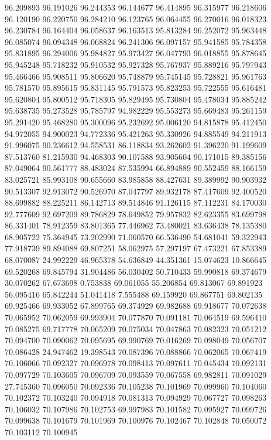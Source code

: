 96.209893
96.191026
96.244353
96.144677
96.414895
96.315977
96.218606
96.120190
96.220750
96.284210
96.123765
96.064455
96.270016
96.018323
96.230784
96.164404
96.058637
96.163513
95.813284
96.252072
95.963448
96.085074
96.094348
96.068824
96.241306
96.097157
95.941585
95.784358
95.831895
96.294006
95.984827
95.973427
96.047793
96.018855
95.878645
95.945248
95.718232
95.910532
95.927328
95.767937
95.889216
95.797943
95.466466
95.908511
95.806620
95.748879
95.745145
95.728821
95.961763
95.781570
95.895615
95.831145
95.791573
95.823253
95.722555
95.616481
95.620804
95.800512
95.718305
95.829495
95.730804
95.478034
95.885242
95.638735
95.273528
95.785797
94.982229
95.553273
95.669483
95.261159
95.291420
95.468280
95.300096
95.232692
95.006120
94.815878
95.412450
94.972055
94.900023
94.772336
95.421263
95.330926
94.885549
94.211913
91.996075
90.236612
94.558531
86.118834
93.262602
91.396220
91.199609
87.513760
81.215930
94.468303
90.107588
93.905604
90.171015
89.385156
87.049064
90.561777
88.483024
87.535994
66.894889
90.552459
88.166159
83.025721
85.993108
90.655660
83.985858
88.427631
89.389992
90.903932
90.513307
92.913072
90.526970
87.047797
89.932178
87.417609
92.400520
88.699882
88.225211
86.142713
89.514846
91.126115
87.112231
84.170030
92.777609
92.697209
89.786829
78.649852
79.957832
82.623355
83.699798
86.331401
78.912359
83.801365
77.446962
73.480021
83.636438
78.135380
68.905722
75.364945
73.202990
71.060570
66.536490
54.681041
59.322943
77.918739
89.894088
69.807251
58.062975
57.297197
67.473221
67.853389
68.070087
24.992229
46.965378
54.636849
44.351361
15.074623
10.866645
69.520268
69.845794
31.904486
56.030402
50.710433
59.990818
69.374679
30.070262
67.673698
0.753838
69.061055
55.206854
69.813067
69.891923
56.095416
65.842244
51.041418
7.555488
69.159920
69.867751
69.802135
69.925466
69.933052
67.899765
69.374929
69.982688
69.918677
70.072638
70.065952
70.062059
69.993904
70.077870
70.091181
70.064519
69.596410
70.085275
69.717778
70.065209
70.075034
70.047863
70.082323
70.051212
70.094700
70.090062
70.095695
69.990769
70.016269
70.098049
70.056707
70.086428
24.947462
19.398543
70.087396
70.088866
70.062065
70.067419
70.106066
70.092327
70.096978
70.098413
70.097611
70.045434
70.092131
70.097729
70.103605
70.096709
70.093559
70.067558
69.982811
70.091029
27.745360
70.096050
70.092336
70.105238
70.101969
70.099960
70.104060
70.102372
70.103240
70.094918
70.081313
70.094929
70.067727
70.098263
70.106032
70.107986
70.102753
69.997983
70.101582
70.095927
70.099726
70.099638
70.101679
70.101969
70.100976
70.102467
70.102848
70.050072
70.103112
70.100945
